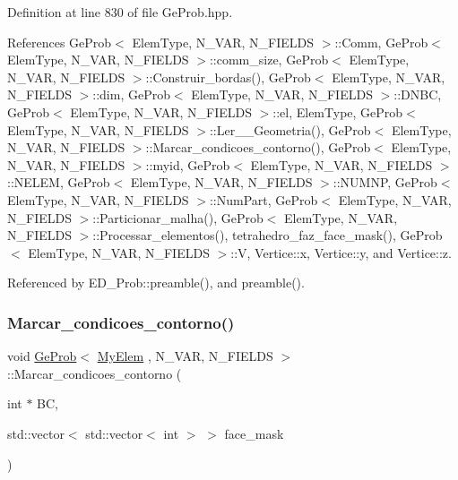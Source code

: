 Definition at line 830 of file Ge\+Prob.\+hpp.



References Ge\+Prob$<$ Elem\+Type, N\+\_\+\+V\+A\+R, N\+\_\+\+F\+I\+E\+L\+D\+S $>$\+::\+Comm, Ge\+Prob$<$ Elem\+Type, N\+\_\+\+V\+A\+R, N\+\_\+\+F\+I\+E\+L\+D\+S $>$\+::comm\+\_\+size, Ge\+Prob$<$ Elem\+Type, N\+\_\+\+V\+A\+R, N\+\_\+\+F\+I\+E\+L\+D\+S $>$\+::\+Construir\+\_\+bordas(), Ge\+Prob$<$ Elem\+Type, N\+\_\+\+V\+A\+R, N\+\_\+\+F\+I\+E\+L\+D\+S $>$\+::dim, Ge\+Prob$<$ Elem\+Type, N\+\_\+\+V\+A\+R, N\+\_\+\+F\+I\+E\+L\+D\+S $>$\+::\+D\+N\+BC, Ge\+Prob$<$ Elem\+Type, N\+\_\+\+V\+A\+R, N\+\_\+\+F\+I\+E\+L\+D\+S $>$\+::el, Elem\+Type, Ge\+Prob$<$ Elem\+Type, N\+\_\+\+V\+A\+R, N\+\_\+\+F\+I\+E\+L\+D\+S $>$\+::\+Ler\+\_\+\+\_\+\+Geometria(), Ge\+Prob$<$ Elem\+Type, N\+\_\+\+V\+A\+R, N\+\_\+\+F\+I\+E\+L\+D\+S $>$\+::\+Marcar\+\_\+condicoes\+\_\+contorno(), Ge\+Prob$<$ Elem\+Type, N\+\_\+\+V\+A\+R, N\+\_\+\+F\+I\+E\+L\+D\+S $>$\+::myid, Ge\+Prob$<$ Elem\+Type, N\+\_\+\+V\+A\+R, N\+\_\+\+F\+I\+E\+L\+D\+S $>$\+::\+N\+E\+L\+EM, Ge\+Prob$<$ Elem\+Type, N\+\_\+\+V\+A\+R, N\+\_\+\+F\+I\+E\+L\+D\+S $>$\+::\+N\+U\+M\+NP, Ge\+Prob$<$ Elem\+Type, N\+\_\+\+V\+A\+R, N\+\_\+\+F\+I\+E\+L\+D\+S $>$\+::\+Num\+Part, Ge\+Prob$<$ Elem\+Type, N\+\_\+\+V\+A\+R, N\+\_\+\+F\+I\+E\+L\+D\+S $>$\+::\+Particionar\+\_\+malha(), Ge\+Prob$<$ Elem\+Type, N\+\_\+\+V\+A\+R, N\+\_\+\+F\+I\+E\+L\+D\+S $>$\+::\+Processar\+\_\+elementos(), tetrahedro\+\_\+faz\+\_\+face\+\_\+mask(), Ge\+Prob$<$ Elem\+Type, N\+\_\+\+V\+A\+R, N\+\_\+\+F\+I\+E\+L\+D\+S $>$\+::V, Vertice\+::x, Vertice\+::y, and Vertice\+::z.



Referenced by E\+D\+\_\+\+Prob\+::preamble(), and preamble().

\mbox{\label{classGeProb_a6fc2ba08f7556408bd9082ed34ada7bd}} 
\subsubsection{\texorpdfstring{Marcar\+\_\+condicoes\+\_\+contorno()}{Marcar\_condicoes\_contorno()}}
{\footnotesize\ttfamily void \hyperlink{classGeProb}{Ge\+Prob}$<$ \hyperlink{DG__Prob_8h_a83cd887ced9a6587428f267e50cd4787}{My\+Elem} , N\+\_\+\+V\+AR, N\+\_\+\+F\+I\+E\+L\+DS $>$\+::Marcar\+\_\+condicoes\+\_\+contorno (\begin{DoxyParamCaption}\item[{int $\ast$}]{BC,  }\item[{std\+::vector$<$ std\+::vector$<$ int $>$ $>$}]{face\+\_\+mask }\end{DoxyParamCaption})\hspace{0.3cm}{\ttfamily [inherited]}}



